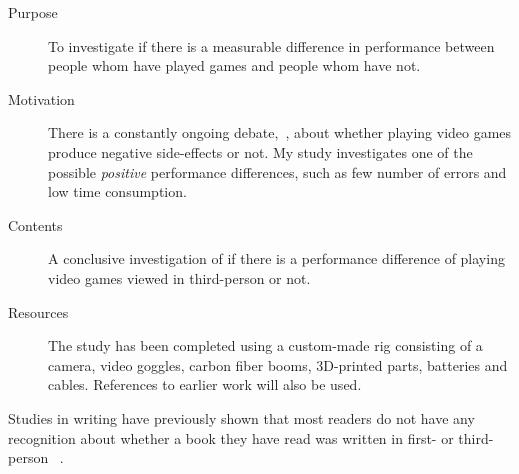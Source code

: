 \documentclass[runningheads,a4paper,oribibl]{llncs}
\begin{document}
\begin{description}
   \item[Purpose] To investigate if there is a measurable difference in performance between people whom have played games and people whom have not.
   \item[Motivation] There is a constantly ongoing debate,~\cite{valadez2012just}, about whether playing video games produce negative side-effects or not. My study investigates one of the possible \emph{positive} performance differences, such as few number of errors and low time consumption.
   \item[Contents] A conclusive investigation of if there is a performance difference of playing video games viewed in third-person or not.
   \item[Resources] The study has been completed using a custom-made rig consisting of a camera, video goggles, carbon fiber booms, 3D-printed parts, batteries and cables. References to earlier work will also be used.
\end{description}




Studies in writing have previously shown that most readers do not have any recognition about whether a book they have read was written in first- or third-person ~\cite{hagg2012nya}. 












\end{document}
